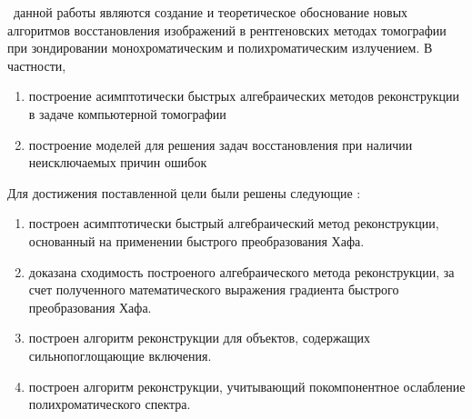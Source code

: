 \begin{comment}
Отсутствие учета специфики проводимых исследований --- не единственная причина возникновения артефактов. 
Неточности, порождающие ошибки обработки, появляются на каждом этапе формирования картны измерений: аппаратная часть, восстановление и интерпретация полученных результатов.
Ошибки аппаратной части появляются в физической калибровке измерительной аппаратуры, калибровке геометрического расположения элементов в измерительной схеме, а так же при формировании входного сигнала для алгоритмов восстановления. 
К первым можно отнести ошибку в величине суммарной интенсивности излучения источника, в результате чего восстановленная картина может получиться ``пересвеченной''.
Примером второй причины может служить экспериментальная схема, в которой ось вращения объекта смещена относительно оси ``источник-детектор''.
Наконец, к погрешностям, вносимым аппаратурой, можно отнести шумы матрицы детектора, или наоборот, пересвечивание пикселей детектора.
На этапе алгоритмов восстановления могут быть внесены ошбики, связанные с вычислительной точностью программного обеспечения, сходимостью оптимизационных процедур (локальный минимум, недостижение минимума), слишком агрессивной регуляризацией. 
Последняя возможная причина состоит из ошибок визуализации трехмерных восстановленных картин и неправильной их интерпретации.
\end{comment}

{\aim} ~данной работы являются создание и теоретическое обоснование новых алгоритмов восстановления изображений в рентгеновских методах томографии при зондировании монохроматическим и полихроматическим излучением. В частности, 
\begin{enumerate}
\item построение асимптотически быстрых алгебраических методов реконструкции в задаче компьютерной томографии
\item построение моделей для решения задач восстановления при наличии неисключаемых причин ошибок
\end{enumerate}

Для достижения поставленной цели были решены следующие {\tasks}:
\begin{enumerate}
  \item построен асимптотически быстрый алгебраический метод реконструкции, основанный на применении быстрого преобразования Хафа.
  \item доказана сходимость построеного алгебраического метода реконструкции, за счет полученного математического выражения градиента быстрого преобразования Хафа.
  \item построен алгоритм реконструкции для объектов, содержащих сильнопоглощающие включения.
  \item построен алгоритм реконструкции, учитывающий покомпонентное ослабление полихроматического спектра.
\end{enumerate}

